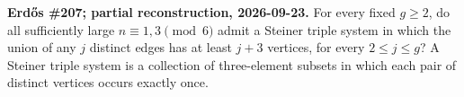 \textbf{Erd\H{o}s \#207; partial reconstruction, 2026-09-23.}
For every fixed $g\geq2$, do all sufficiently large $n\equiv1,3\pmod6$ admit a Steiner triple system in which the union of any $j$ distinct edges has at least $j+3$ vertices, for every $2\leq j\leq g$? A Steiner triple system is a collection of three-element subsets in which each pair of distinct vertices occurs exactly once.

